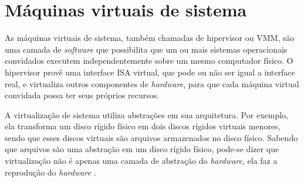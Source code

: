 

\section{Máquinas virtuais de sistema}
\label{section:virtsistema}

As máquinas virtuais de sistema, também chamadas de hipervisor ou \ac{VMM}, são uma camada de \textit{software} que possibilita
que um ou mais sistemas operacionais convidados executem independentemente sobre um mesmo computador físico. O hipervisor provê uma interface
\ac{ISA} virtual, que pode ou não ser igual a interface real, e virtualiza outros componentes de \textit{hardware}, para que cada máquina
virtual convidada possa ter seus próprios recursos.

A virtualização de sistema utiliza abstrações em sua arquitetura. Por exemplo, ela transforma um disco rígido físico em dois discos rígidos
virtuais menores, sendo que esses discos virtuais são arquivos armazenados no disco físico. Sabendo que arquivos são uma abstração
em um disco rígido físico, pode-se dizer que virtualização não é apenas uma camada de abstração do \textit{hardware}, ela faz a reprodução 
do \textit{hardware} \cite{smithenair2005}.

